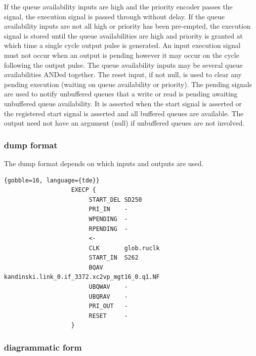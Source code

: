                 If the queue availability inputs are high and the priority
                encoder passes the signal, the execution signal is passed
                through without delay. If the queue availability inputs are not
                all high or priority has been pre-empted, the execution signal
                is stored until the queue availabilities are high and priority
                is granted at which time a single cycle output pulse is
                generated. An input execution signal must not occur when an
                output is pending however it may occur on the cycle following
                the output pulse. The queue availability inputs may be several
                queue availabilities ANDed together. The reset input, if not
                null, is used to clear any pending execution (waiting on queue
                availability or priority). The pending signals are used to
                notify unbuffered queues that a write or read is pending
                awaiting unbuffered queue availability. It is asserted when the
                start signal is asserted or the registered start signal is
                asserted and all buffered queues are available. The output need
                not have an argument (null) if unbuffered queues are not
                involved.

            \subsubsection{dump format}
            
                The dump format depends on which inputs and outputs
                are used.
            
                \begin{lstlisting}{gobble=16, language={tde}}
                   EXECP {
                        START_DEL SD250
                        PRI_IN    -
                        WPENDING  -
                        RPENDING  -
                        <-
                        CLK       glob.ruclk
                        START_IN  S262
                        BQAV      kandinski.link_0.if_3372.xc2vp_mgt16_0.q1.NF
                        UBQWAV    -
                        UBQRAV    -
                        PRI_OUT   -
                        RESET     -
                   }
                \end{lstlisting}

            \subsubsection{diagrammatic form}

